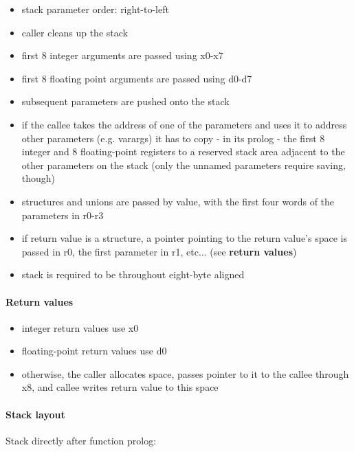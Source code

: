 \begin{itemize}
\item stack parameter order: right-to-left
\item caller cleans up the stack
\item first 8 integer arguments are passed using x0-x7
\item first 8 floating point arguments are passed using d0-d7
\item subsequent parameters are pushed onto the stack
\item if the callee takes the address of one of the parameters and uses it to address other parameters (e.g. varargs) it has to copy - in its prolog - the first 8 integer and 8 floating-point registers to a reserved stack area adjacent to the other parameters on the stack (only the unnamed parameters require saving, though)
\item structures and unions are passed by value, with the first four words of the parameters in r0-r3
\item if return value is a structure, a pointer pointing to the return value's space is passed in r0, the first parameter in r1, etc... (see {\bf return values})
\item stack is required to be throughout eight-byte aligned
\end{itemize}

\paragraph{Return values}
\begin{itemize}
\item integer return values use x0
\item floating-point return values use d0
\item otherwise, the caller allocates space, passes pointer to it to the callee through x8, and callee writes return value to this space
\end{itemize}

\paragraph{Stack layout}

Stack directly after function prolog:\\

